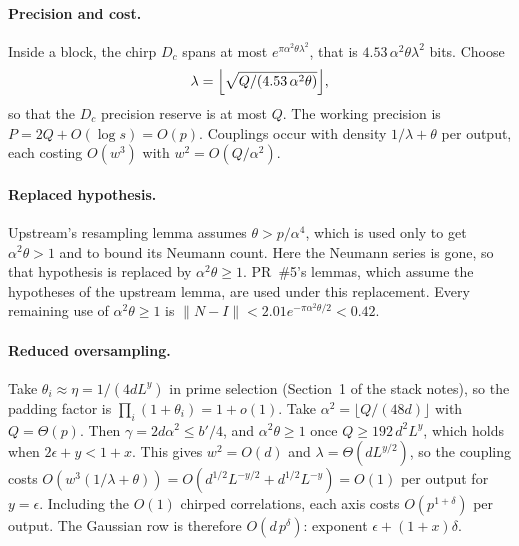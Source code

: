 \documentclass[11pt]{article}
\theoremstyle{remark}\newtheorem*{remark}{Remark}
\begin{document}
\paragraph{Precision and cost.} Inside a block, the chirp $D_c$ spans at most
$e^{\pi\alpha^2\theta\lambda^2}$, that is $4.53\,\alpha^2\theta\lambda^2$ bits. Choose
\[
 \lambda=\Bigl\lfloor\sqrt{Q/(4.53\,\alpha^2\theta)}\Bigr\rfloor,
\]
so that the $D_c$ precision reserve is at most $Q$. The working precision is $P=2Q+O(\log s)=O(p)$. Couplings occur with density
$1/\lambda+\theta$ per output, each costing $O(w^3)$ with $w^2=O(Q/\alpha^2)$.

\paragraph{Replaced hypothesis.} Upstream's resampling lemma assumes $\theta>p/\alpha^4$, which is used only
to get $\alpha^2\theta>1$ and to bound its Neumann count. Here the Neumann series is gone, so that
hypothesis is replaced by $\alpha^2\theta\ge1$. PR~\#5's lemmas, which assume the hypotheses of the
upstream lemma, are used under this replacement. Every remaining use of $\alpha^2\theta\ge1$ is
$\|N-I\|<2.01e^{-\pi\alpha^2\theta/2}<0.42$.

\paragraph{Reduced oversampling.} Take $\theta_i\approx\eta=1/(4dL^y)$ in prime selection
(Section~1 of the stack notes), so the padding factor is $\prod_i(1+\theta_i)=1+o(1)$.
Take $\alpha^2=\lfloor Q/(48d)\rfloor$ with $Q=\Theta(p)$. Then $\gamma=2d\alpha^2\le b'/4$, and
$\alpha^2\theta\ge1$ once $Q\ge192\,d^2L^y$, which holds when $2\epsilon+y<1+x$. This gives
$w^2=O(d)$ and $\lambda=\Theta(dL^{y/2})$, so the coupling costs
$O(w^3(1/\lambda+\theta))=O(d^{1/2}L^{-y/2}+d^{1/2}L^{-y})=O(1)$ per output for $y=\epsilon$.
Including the $O(1)$ chirped correlations, each axis costs $O(p^{1+\delta})$ per output. The
Gaussian row is therefore $O(d\,p^\delta)$: exponent $\epsilon+(1+x)\delta$.
\end{document}

